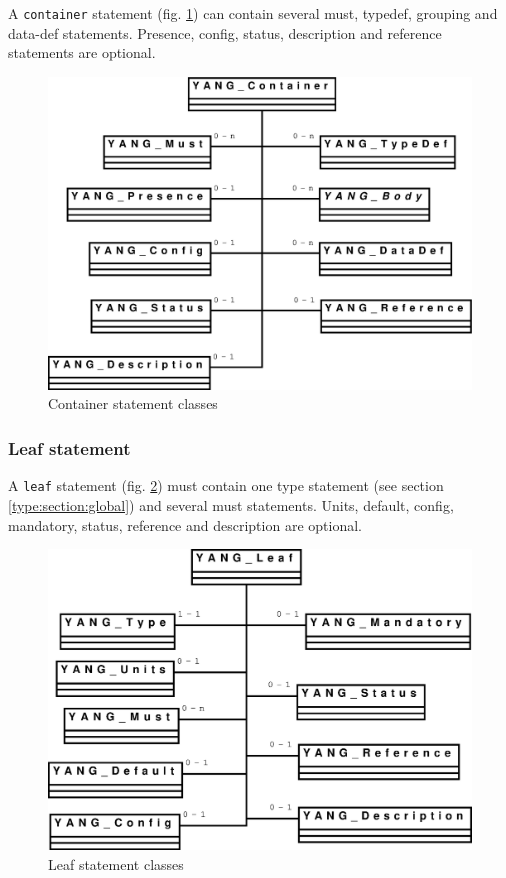 \documentclass[a4paper]{article}
\begin{document}
A  {\tt  container}  statement  (fig.   \ref{container})  can  contain
several  must, typedef,  grouping and  data-def  statements. Presence,
config, status, description and reference statements are optional.
\begin{figure}[htbp]
\begin{center}
\includegraphics[scale = .3]{container.eps}
\end{center}
\caption{Container statement classes}
\label{container}
\end{figure}

\subsubsection{Leaf statement}

A  {\tt  leaf}  statement  (fig.  \ref{leaf}) must  contain  one  type
statement  (see section  \ref{type:section:global})  and several  must
statements.  Units, default,  config, mandatory, status, reference and
description are optional.
\begin{figure}[htbp]
\begin{center}
\includegraphics[scale = .3]{leaf.eps}
\end{center}
\caption{Leaf statement classes}
\label{leaf}
\end{figure}
\end{document}

